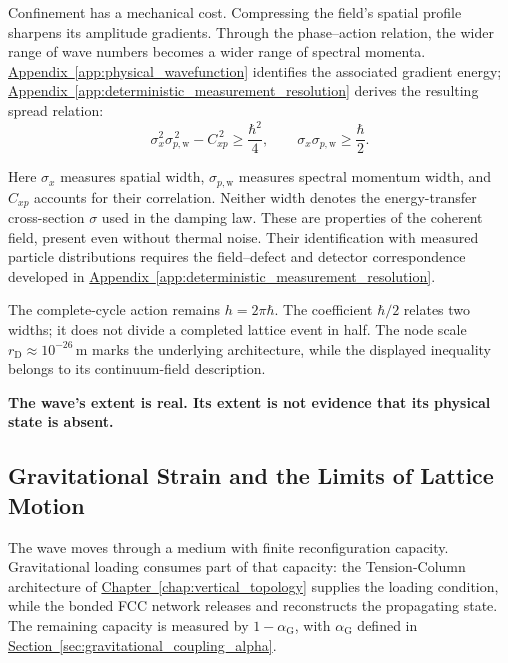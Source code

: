 Confinement has a mechanical cost. Compressing the field's spatial profile sharpens its amplitude gradients. Through the phase--action relation, the wider range of wave numbers becomes a wider range of spectral momenta. \hyperref[app:physical_wavefunction]{Appendix~\ref*{app:physical_wavefunction}} identifies the associated gradient energy; \hyperref[app:deterministic_measurement_resolution]{Appendix~\ref*{app:deterministic_measurement_resolution}} derives the resulting spread relation:
\begin{equation}
    \sigma_x^2\sigma_{p,\mathrm w}^{\,2}
    -
    C_{xp}^{\,2}
    \geq
    \frac{\hbar^2}{4},
    \qquad
    \sigma_x\sigma_{p,\mathrm w}
    \geq
    \frac{\hbar}{2}.
\end{equation}

Here $\sigma_x$ measures spatial width, $\sigma_{p,\mathrm w}$ measures spectral momentum width, and $C_{xp}$ accounts for their correlation. Neither width denotes the energy-transfer cross-section $\sigma$ used in the damping law. These are properties of the coherent field, present even without thermal noise. Their identification with measured particle distributions requires the field--defect and detector correspondence developed in \hyperref[app:deterministic_measurement_resolution]{Appendix~\ref*{app:deterministic_measurement_resolution}}.

The complete-cycle action remains $h=2\pi\hbar$. The coefficient $\hbar/2$ relates two widths; it does not divide a completed lattice event in half. The node scale $r_{\mathrm D}\approx10^{-26}\,\mathrm m$ marks the underlying architecture, while the displayed inequality belongs to its continuum-field description.

\textbf{The wave's extent is real. Its extent is not evidence that its physical state is absent.}


\subsection{Gravitational Strain and the Limits of Lattice Motion}

The wave moves through a medium with finite reconfiguration capacity. Gravitational loading consumes part of that capacity: the Tension-Column architecture of \hyperref[chap:vertical_topology]{Chapter~\ref*{chap:vertical_topology}} supplies the loading condition, while the bonded FCC network releases and reconstructs the propagating state. The remaining capacity is measured by $1-\alpha_{\mathrm G}$, with $\alpha_{\mathrm G}$ defined in \hyperref[sec:gravitational_coupling_alpha]{Section~\ref*{sec:gravitational_coupling_alpha}}.


